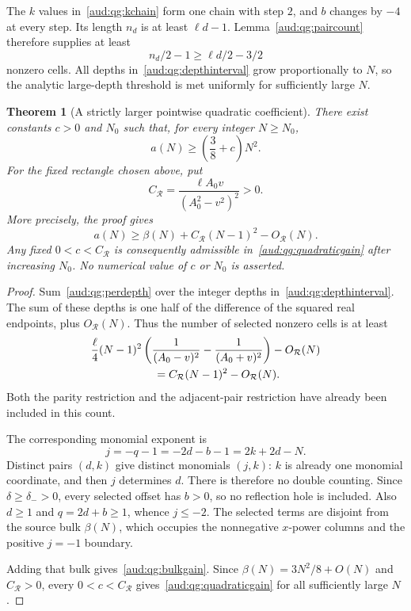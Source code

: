 \documentclass[11pt,a4paper]{article}
\numberwithin{equation}{section}
\newtheorem{theorem}{Theorem}[section]
\begin{document}
The $k$ values in~\eqref{aud:qg:kchain} form one chain with step $2$, and $b$ changes by $-4$ at every step. Its length $n_d$ is at least $\ell d-1$. Lemma~\ref{aud:qg:paircount} therefore supplies at least
\begin{equation}\label{aud:qg:perdepth}
 n_d/2-1\ge\ell d/2-3/2
\end{equation}
nonzero cells. All depths in~\eqref{aud:qg:depthinterval} grow proportionally to $N$, so the analytic large-depth threshold is met uniformly for sufficiently large $N$.

\begin{theorem}[A strictly larger pointwise quadratic coefficient]\label{aud:qg:count}
There exist constants $c>0$ and $N_0$ such that, for every integer $N\ge N_0$,
\begin{equation}\label{aud:qg:quadraticgain}
 a(N)\ge\left(\frac38+c\right)N^2.
\end{equation}
For the fixed rectangle chosen above, put
\begin{equation}\label{aud:qg:CR}
 C_{\mathcal R}=\frac{\ell A_0v}{(A_0^2-v^2)^2}>0.
\end{equation}
More precisely, the proof gives
\begin{equation}\label{aud:qg:bulkgain}
 a(N)\ge\beta(N)+C_{\mathcal R}(N-1)^2-O_{\mathcal R}(N).
\end{equation}
Any fixed $0<c<C_{\mathcal R}$ is consequently admissible in~\eqref{aud:qg:quadraticgain} after increasing $N_0$. No numerical value of $c$ or $N_0$ is asserted.
\end{theorem}
\begin{proof}
Sum~\eqref{aud:qg:perdepth} over the integer depths in~\eqref{aud:qg:depthinterval}. The sum of these depths is one half of the difference of the squared real endpoints, plus $O_{\mathcal R}(N)$. Thus the number of selected nonzero cells is at least
\begin{align*}
 &\frac{\ell}{4}(N-1)^2
 \left(\frac1{(A_0-v)^2}-\frac1{(A_0+v)^2}\right)
 -O_{\mathcal R}(N)\\
 &\hspace{20mm}=C_{\mathcal R}(N-1)^2-O_{\mathcal R}(N).
\end{align*}
Both the parity restriction and the adjacent-pair restriction have already been included in this count.

The corresponding monomial exponent is
\begin{equation}\label{aud:qg:monomial}
 j=-q-1=-2d-b-1=2k+2d-N.
\end{equation}
Distinct pairs $(d,k)$ give distinct monomials $(j,k)$: $k$ is already one monomial coordinate, and then $j$ determines $d$. There is therefore no double counting. Since $\delta\ge\delta_->0$, every selected offset has $b>0$, so no reflection hole is included. Also $d\ge1$ and $q=2d+b\ge1$, whence $j\le-2$. The selected terms are disjoint from the source bulk $\beta(N)$, which occupies the nonnegative $x$-power columns and the positive $j=-1$ boundary.

Adding that bulk gives~\eqref{aud:qg:bulkgain}. Since $\beta(N)=3N^2/8+O(N)$ and $C_{\mathcal R}>0$, every $0<c<C_{\mathcal R}$ gives~\eqref{aud:qg:quadraticgain} for all sufficiently large $N$.
\end{proof}
\end{document}
